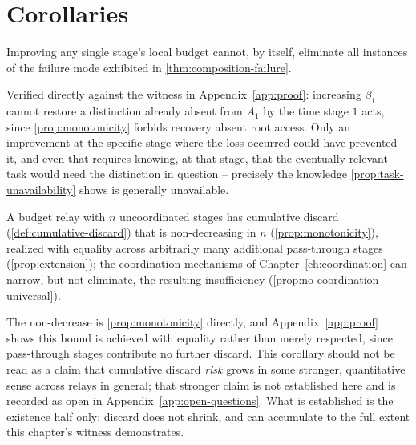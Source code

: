 \section{Corollaries}

\begin{corollary}
\label{cor:local-improvement}
Improving any single stage's local budget cannot, by itself, eliminate
all instances of the failure mode exhibited in
\cref{thm:composition-failure}.
\end{corollary}

\begin{proofsketch}
Verified directly against the witness in Appendix~\ref{app:proof}:
increasing $\beta_1$ cannot restore a distinction already absent from
$A_1$ by the time stage $1$ acts, since \cref{prop:monotonicity} forbids
recovery absent root access. Only an improvement at the specific stage
where the loss occurred could have prevented it, and even that requires
knowing, at that stage, that the eventually-relevant task would need the
distinction in question -- precisely the knowledge
\cref{prop:task-unavailability} shows is generally unavailable.
\end{proofsketch}

\begin{corollary}
\label{cor:no-free-lunch}
A budget relay with $n$ uncoordinated stages has cumulative discard
(\cref{def:cumulative-discard}) that is non-decreasing in $n$
(\cref{prop:monotonicity}), realized with equality across arbitrarily
many additional pass-through stages
(\cref{prop:extension}); the coordination mechanisms of
Chapter~\ref{ch:coordination} can narrow, but not eliminate, the
resulting insufficiency (\cref{prop:no-coordination-universal}).
\end{corollary}

\begin{proofsketch}
The non-decrease is \cref{prop:monotonicity} directly, and
Appendix~\ref{app:proof} shows this bound is achieved with equality
rather than merely respected, since pass-through stages contribute no
further discard. This corollary should not be read as a claim that
cumulative discard \emph{risk} grows in some stronger, quantitative
sense across relays in general; that stronger claim is not established
here and is recorded as open in Appendix~\ref{app:open-questions}. What
is established is the existence half only: discard does not shrink, and
can accumulate to the full extent this chapter's witness demonstrates.
\end{proofsketch}

